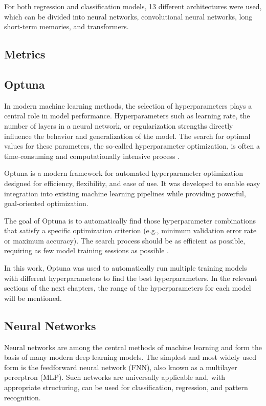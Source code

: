 For both regression and classification models, 13 different architectures were used, which can be divided into neural networks, convolutional neural networks, long short-term memories, and transformers.

\subsection{Metrics}

\subsection{Optuna}

In modern machine learning methods, the selection of hyperparameters plays a central role in model performance.
Hyperparameters such as learning rate, the number of layers in a neural network, or regularization strengths directly influence the behavior and generalization of the model.
The search for optimal values for these parameters, the so-called hyperparameter optimization, is often a time-consuming and computationally intensive process \cite{hyperparameter-importance}.

Optuna is a modern framework for automated hyperparameter optimization designed for efficiency, flexibility, and ease of use.
It was developed to enable easy integration into existing machine learning pipelines while providing powerful, goal-oriented optimization.

The goal of Optuna is to automatically find those hyperparameter combinations that satisfy a specific optimization criterion (e.g., minimum validation error rate or maximum accuracy).
The search process should be as efficient as possible, requiring as few model training sessions as possible \cite{optuna-hyperparameters}.

In this work, Optuna was used to automatically run multiple training models with different hyperparameters to find the best hyperparameters.
In the relevant sections of the next chapters, the range of the hyperparameters for each model will be mentioned.

\subsection{Neural Networks}

Neural networks are among the central methods of machine learning and form the basis of many modern deep learning models.
The simplest and most widely used form is the feedforward neural network (FNN), also known as a multilayer perceptron (MLP).
Such networks are universally applicable and, with appropriate structuring, can be used for classification, regression, and pattern recognition.

